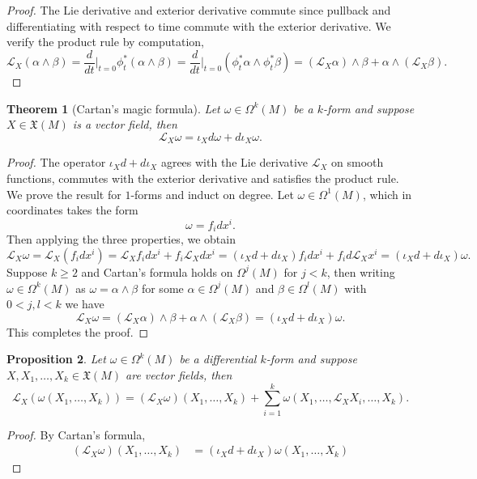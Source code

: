 \documentclass[reqno]{amsart}
\newtheorem{theorem}{Theorem}
\newtheorem{proposition}[theorem]{Proposition}
\theoremstyle{definition}
\theoremstyle{remark}
\begin{document}
\begin{proof}
	The Lie derivative and exterior derivative commute since pullback and differentiating with respect to time commute with the exterior derivative. We verify the product rule by computation, 
		\[ \mathcal L_X (\alpha \wedge \beta) = \frac{d}{dt} \Big|_{t = 0} \phi^*_t (\alpha \wedge \beta) = \frac{d}{dt} \Big|_{t = 0} (\phi^*_t \alpha \wedge \phi^*_t \beta) = (\mathcal L_X \alpha) \wedge \beta + \alpha \wedge ( \mathcal L_X \beta). \]
\end{proof}

\begin{theorem}[Cartan's magic formula]
	Let $\omega \in \Omega^k (M)$ be a $k$-form and suppose $X \in \mathfrak X (M)$ is a vector field, then 
		\[ \mathcal L_X \omega = \iota_X d \omega + d \iota_X \omega. \]
\end{theorem}
	
\begin{proof}
	The operator $\iota_X d + d \iota_X$ agrees with the Lie derivative $\mathcal L_X$ on smooth functions, commutes with the exterior derivative and satisfies the product rule. We prove the result for $1$-forms and induct on degree. Let $\omega \in \Omega^1 (M)$, which in coordinates takes the form
		\[ \omega = f_i dx^i. \]
	Then applying the three properties, we obtain
		\[ \mathcal L_X \omega = \mathcal L_X (f_i dx^i) = \mathcal L_X f_i dx^i + f_i \mathcal L_X dx^i = (\iota_X d + d \iota_X)f_i dx^i + f_i d \mathcal L_X x^i = (\iota_X d + d \iota_X) \omega. \]
	Suppose $k \geq 2$ and Cartan's formula holds on $\Omega^j (M)$ for $j < k$, then writing $\omega \in \Omega^k (M)$ as $\omega = \alpha \wedge \beta$ for some $\alpha \in \Omega^j (M)$ and $\beta \in \Omega^l (M)$ with $0 < j, l < k$ we have
		\[ \mathcal L_X \omega = (\mathcal L_X \alpha) \wedge \beta + \alpha \wedge (\mathcal L_X \beta) = (\iota_X d + d \iota_X) \omega.  \]
	This completes the proof. 
\end{proof}

\begin{proposition}
	Let $\omega \in \Omega^k (M)$ be a differential $k$-form and suppose $X, X_1, \dots, X_k \in \mathfrak X (M)$ are vector fields, then 
		\[ \mathcal L_X (\omega(X_1, \dots, X_k)) = (\mathcal L_X \omega) (X_1, \dots, X_k) + \sum_{i = 1}^k \omega(X_1, \dots, \mathcal L_X X_i, \dots, X_k). \]
\end{proposition}

\begin{proof}
	By Cartan's formula, 
		\begin{align*}
			(\mathcal L_X \omega)(X_1, \dots, X_k)
				&= (\iota_X d + d \iota_X) \omega(X_1, \dots, X_k)
		\end{align*}
		
\end{proof}
\end{document}
